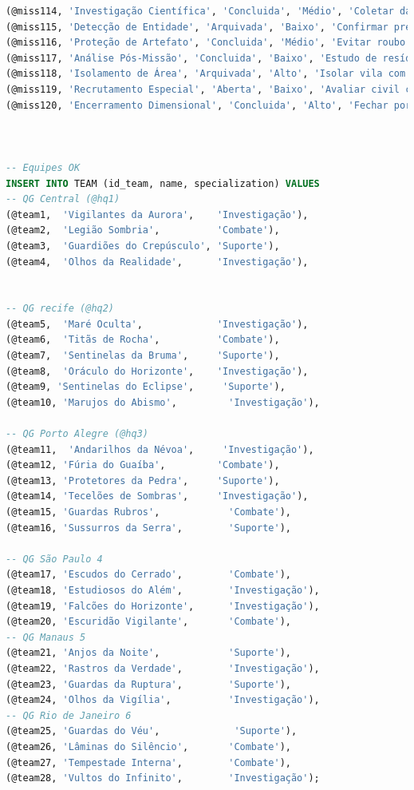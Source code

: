 \documentclass[12pt,a4paper]{report}
\begin{document}
\begin{lstlisting}[language=SQL, caption=population.sql]
(@miss114, 'Investigação Científica', 'Concluida', 'Médio', 'Coletar dados para estudo acadêmico autorizado', '2025-02-10','2025-02-20',@addr16, @hq6),
(@miss115, 'Detecção de Entidade', 'Arquivada', 'Baixo', 'Confirmar presença de entidade menor', '2024-12-01', '2024-12-03',        @addr17, @hq6),
(@miss116, 'Proteção de Artefato', 'Concluida', 'Médio', 'Evitar roubo de artefato lacrado', '2025-04-24', '2025-05-14',                       @addr18, @hq6),
(@miss117, 'Análise Pós-Missão', 'Concluida', 'Baixo', 'Estudo de resíduos energéticos deixados', '2025-01-18','2025-02-15',        @addr19, @hq6),
(@miss118, 'Isolamento de Área', 'Arquivada', 'Alto', 'Isolar vila com presença paranatural intensa', '2024-07-20', '2024-07-30',   @addr20, @hq6),
(@miss119, 'Recrutamento Especial', 'Aberta', 'Baixo', 'Avaliar civil com potencial psíquico', '2025-05-16', NULL,                  @addr21, @hq6),
(@miss120, 'Encerramento Dimensional', 'Concluida', 'Alto', 'Fechar portal aberto por acidente', '2025-03-25', '2025-05-25',        @addr22, @hq6);



-- Equipes OK
INSERT INTO TEAM (id_team, name, specialization) VALUES
-- QG Central (@hq1)
(@team1,  'Vigilantes da Aurora',    'Investigação'),
(@team2,  'Legião Sombria',          'Combate'),
(@team3,  'Guardiões do Crepúsculo', 'Suporte'),
(@team4,  'Olhos da Realidade',      'Investigação'),


-- QG recife (@hq2)
(@team5,  'Maré Oculta',             'Investigação'),
(@team6,  'Titãs de Rocha',          'Combate'),
(@team7,  'Sentinelas da Bruma',     'Suporte'),
(@team8,  'Oráculo do Horizonte',    'Investigação'),
(@team9, 'Sentinelas do Eclipse',     'Suporte'),
(@team10, 'Marujos do Abismo',         'Investigação'),

-- QG Porto Alegre (@hq3)
(@team11,  'Andarilhos da Névoa',     'Investigação'),
(@team12, 'Fúria do Guaíba',         'Combate'),
(@team13, 'Protetores da Pedra',     'Suporte'),
(@team14, 'Tecelões de Sombras',     'Investigação'),
(@team15, 'Guardas Rubros',            'Combate'),
(@team16, 'Sussurros da Serra',        'Suporte'),

-- QG São Paulo 4
(@team17, 'Escudos do Cerrado',        'Combate'),
(@team18, 'Estudiosos do Além',        'Investigação'),
(@team19, 'Falcões do Horizonte',      'Investigação'),
(@team20, 'Escuridão Vigilante',       'Combate'),
-- QG Manaus 5
(@team21, 'Anjos da Noite',            'Suporte'),
(@team22, 'Rastros da Verdade',        'Investigação'),
(@team23, 'Guardas da Ruptura',        'Suporte'),
(@team24, 'Olhos da Vigília',          'Investigação'),
-- QG Rio de Janeiro 6
(@team25, 'Guardas do Véu',             'Suporte'),
(@team26, 'Lâminas do Silêncio',       'Combate'),
(@team27, 'Tempestade Interna',        'Combate'),
(@team28, 'Vultos do Infinito',        'Investigação');


\end{lstlisting}
\end{document}
